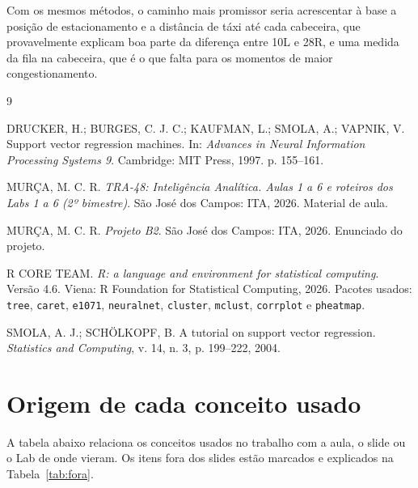 \documentclass[12pt,a4paper]{article}
\begin{document}
Com os mesmos métodos, o caminho mais promissor seria acrescentar à base a posição de estacionamento e a distância de táxi até cada cabeceira, que provavelmente explicam boa parte da diferença entre 10L e 28R, e uma medida da fila na cabeceira, que é o que falta para os momentos de maior congestionamento.

\newpage
\begin{thebibliography}{9}

DRUCKER, H.; BURGES, C. J. C.; KAUFMAN, L.; SMOLA, A.; VAPNIK, V. Support vector regression machines. In: \textit{Advances in Neural Information Processing Systems 9}. Cambridge: MIT Press, 1997. p. 155--161.

MURÇA, M. C. R. \textit{TRA-48: Inteligência Analítica. Aulas 1 a 6 e roteiros dos Labs 1 a 6 (2º bimestre)}. São José dos Campos: ITA, 2026. Material de aula.

MURÇA, M. C. R. \textit{Projeto B2}. São José dos Campos: ITA, 2026. Enunciado do projeto.

R CORE TEAM. \textit{R: a language and environment for statistical computing}. Versão 4.6. Viena: R Foundation for Statistical Computing, 2026. Pacotes usados: \texttt{tree}, \texttt{caret}, \texttt{e1071}, \texttt{neuralnet}, \texttt{cluster}, \texttt{mclust}, \texttt{corrplot} e \texttt{pheatmap}.

SMOLA, A. J.; SCHÖLKOPF, B. A tutorial on support vector regression. \textit{Statistics and Computing}, v. 14, n. 3, p. 199--222, 2004.

\end{thebibliography}

\appendix

\section{Origem de cada conceito usado}\label{ap:conceitos}

A tabela abaixo relaciona os conceitos usados no trabalho com a aula, o slide ou o Lab de onde vieram. Os itens fora dos slides estão marcados e explicados na Tabela~\ref{tab:fora}.
\end{document}
